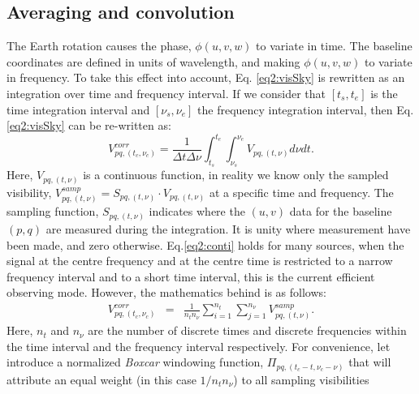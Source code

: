 \documentclass[useAMS,usenatbib]{mn2e}
\begin{document}
\subsection{Averaging and convolution}
\label{sec:AvgCon}
The Earth rotation causes the phase, $\phi (u,v,w)$ to variate in time. The baseline 
coordinates are defined in units of wavelength, and making $\phi (u,v,w)$ to variate in frequency. 
To take this effect into account, Eq. \ref{eq2:visSky} is  rewritten as an integration over time and frequency interval. If we 
consider that $[t_s,t_e]$ is the time integration interval and $[\nu_s,\nu_e]$ the frequency integration 
interval, then Eq.\ref{eq2:visSky} can be re-written as:
\begin{equation}
V_{pq,(t_c,\nu_c)}^{corr}=\frac{1}{\Delta t \Delta \nu} \int_{t_s}^{t_e}\int_{\nu_s}^{\nu_e}V_{pq,(t,\nu)}d\nu dt.
\label{eq2:conti}
\end{equation}
Here, $V_{pq,(t,\nu)}$ is a continuous function, in reality we know only the sampled visibility,  
$V_{pq,(t,\nu)}^{samp}=S_{pq,(t,\nu)}\cdot V_{pq,(t,\nu)}$ at a specific time and frequency. The sampling function, 
$S_{pq,(t,\nu)}$ indicates where the $(u, v)$ data for the baseline $(p,q)$ are measured  during the 
integration. It is unity where measurement have been made, and zero otherwise.
Eq.\ref{eq2:conti} holds for many sources, when the signal at the centre frequency and at the centre time is restricted to a narrow 
frequency interval and to a short time interval, this is the current efficient observing mode. However, the mathematics behind is as 
follows: 
\begin{eqnarray}
V_{pq,(t_c,\nu_c)}^{corr}&=&\frac{1}{n_t n_{\nu}}  \sum_{i=1}^{n_t}\sum_{j=1}^{n_{\nu}}V_{pq,(t,\nu)}^{samp}.\label{eq2:sample}
\end{eqnarray}
Here, $n_t$ and $n_{\nu}$ are the number of discrete times and discrete frequencies within the time interval  and 
the frequency interval  respectively. For convenience, let introduce a normalized \textit{Boxcar} windowing 
function, $\Pi_{pq,(t_c - t,\nu_c -\nu)}$  that will attribute an equal weight (in this case $1/n_t n_{\nu}$) to all sampling visibilities 
\end{document}
